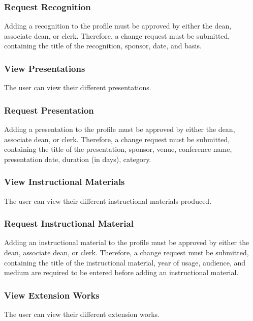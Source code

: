         \subsubsection{Request Recognition}
        Adding a recognition to the profile must be approved by either the dean, associate dean, or clerk. Therefore, a change request must be submitted, containing the title of the recognition, sponsor, date, and basis.
        
        \subsubsection{View Presentations}
        The user can view their different presentations.
        
        \subsubsection{Request Presentation}
        Adding a presentation to the profile must be approved by either the dean, associate dean, or clerk. Therefore, a change request must be submitted, containing the title of the presentation, sponsor, venue, conference name, presentation date, duration (in days), category.
        
        \subsubsection{View Instructional Materials}
        The user can view their different instructional materials produced.
        
        \subsubsection{Request Instructional Material}
        Adding an instructional material to the profile must be approved by either the dean, associate dean, or clerk. Therefore, a change request must be submitted, containing the title of the instructional material, year of usage, audience, and medium are required to be entered before adding an instructional material.
        
        \subsubsection{View Extension Works}
        The user can view their different extension works.
        
